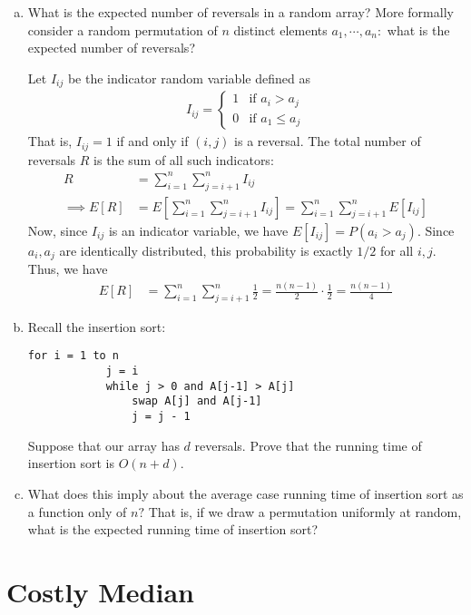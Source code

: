 \documentclass{article}
\begin{document}
\begin{enumerate}[(a)]
	\item What is the expected number of reversals in a random array? More formally consider a random permutation of $n$ distinct elements $a_1, \cdots, a_n:$ what is the expected number of reversals?
		\begin{soln}
			Let $I_{ij}$ be the indicator random variable defined as
			\begin{align*}
				I_{ij} = \begin{cases}
					1 & \text{if } a_i>a_j \\
					0 & \text{if } a_1\le a_j
				\end{cases}
			\end{align*}
			That is, $I_{ij}=1$ if and only if $(i, j)$ is a reversal. The total number of reversals $R$ is the sum of all such indicators:
			\begin{align*}
				R &= \sum_{i=1}^{n} \sum_{j=i+1}^{n} I_{ij} \\
				\implies E[R] &= E\left[ \sum_{i=1}^{n} \sum_{j=i+1}^{n} I_{ij} \right] = \sum_{i=1}^{n} \sum_{j=i+1}^{n} E[I_{ij}]
			\end{align*}
			Now, since $I_{ij}$ is an indicator variable, we have $E[I_{ij}] = P(a_i>a_j).$ Since $a_i, a_j$ are identically distributed, this probability is exactly $1/2$ for all $i, j.$ Thus, we have
			\begin{align*}
				E[R] &= \sum_{i=1}^{n} \sum_{j=i+1}^{n} \frac{1}{2} = \frac{n(n-1)}{2}\cdot \frac{1}{2} = \frac{n(n-1)}{4}
			\end{align*}
		\end{soln}

	\item Recall the insertion sort:		
		\begin{Verbatim}[tabsize=4]
		for i = 1 to n
			j = i
			while j > 0 and A[j-1] > A[j]
				swap A[j] and A[j-1]
				j = j - 1
		\end{Verbatim}
		Suppose that our array has $d$ reversals. Prove that the running time of insertion sort is $O(n+d).$

	\item What does this imply about the average case running time of insertion sort as a function only of $n?$ That is, if we draw a permutation uniformly at random, what is the expected running time of insertion sort? 
		
\end{enumerate}

\section{Costly Median}
 
\end{document}
